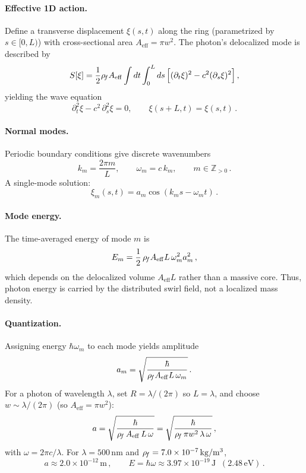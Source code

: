 \documentclass[11pt]{article}
\begin{document}
\paragraph{Effective 1D action.}
    Define a transverse displacement $\xi(s,t)$ along the ring (parametrized by $s\in[0,L)$) with cross-sectional area $A_{\mathrm{eff}}=\pi w^2$. The photon's delocalized mode is described by
    \[
        S[\xi] = \frac{1}{2}\rho_{\!f} A_{\mathrm{eff}} \int dt \int_0^L ds\,\Big[(\partial_t \xi)^2 - c^2 (\partial_s \xi)^2\Big]\,,
    \]
    yielding the wave equation
    \[
        \partial_t^2 \xi - c^2\,\partial_s^2 \xi = 0,\qquad \xi(s+L,t) = \xi(s,t)\,.
    \]

\paragraph{Normal modes.}
    Periodic boundary conditions give discrete wavenumbers
    \[
        k_m = \frac{2\pi m}{L},\qquad \omega_m = c\,k_m,\qquad m\in\mathbb{Z}_{>0}\,.
    \]
    A single-mode solution:
    \[
        \xi_m(s,t) = a_m \cos(k_m s - \omega_m t)\,.
    \]

\paragraph{Mode energy.}
    The time-averaged energy of mode $m$ is
    \[
        E_m = \frac{1}{2}\,\rho_{\!f} A_{\mathrm{eff}} L\,\omega_m^2 a_m^2\,,
    \]
    which depends on the delocalized volume $A_{\mathrm{eff}}L$ rather than a massive core. Thus, photon energy is carried by the distributed swirl field, not a localized mass density.

\paragraph{Quantization.}
    Assigning energy $\hbar \omega_m$ to each mode yields amplitude
    \[
        a_m = \sqrt{\frac{\hbar}{\rho_{\!f} A_{\mathrm{eff}} L \,\omega_m}}\,.
    \]
    For a photon of wavelength $\lambda$, set $R=\lambda/(2\pi)$ so $L=\lambda$, and choose $w\sim\lambda/(2\pi)$ (so $A_{\mathrm{eff}}=\pi w^2$):
    \[
        a = \sqrt{\frac{\hbar}{\rho_{\!f}\,A_{\mathrm{eff}} \,L \,\omega}} = \sqrt{\frac{\hbar}{\rho_{\!f} \,\pi w^2\, \lambda \,\omega}}\,,
    \]
    with $\omega = 2\pi c/\lambda$. For $\lambda = 500\,\mathrm{nm}$ and $\rho_{\!f} = 7.0 \times 10^{-7}\,\mathrm{kg/m^3}$,
    \[
        a \approx 2.0 \times 10^{-12}\,\mathrm{m}\,, \qquad E = \hbar \omega \approx 3.97 \times 10^{-19}\,\mathrm{J}\;\; (2.48\,\mathrm{eV})\,.
    \]
\end{document}
